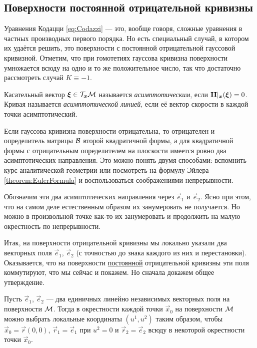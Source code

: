 \subsection{Поверхности постоянной отрицательной кривизны}

Уравнения Кодацци \eqref{eq:Codazzi} --- это, вообще говоря, сложные уравнения в частных производных первого порядка. Но есть специальный случай, в котором их удаётся решить, это поверхности с постоянной отрицательной гауссовой кривизной. Отметим, что при гомотетиях гауссова кривизна поверхности умножается всюду на одно и то же положительное число, так что достаточно рассмотреть случай $K \equiv -1$.

\begin{definition}
	Касательный вектор $\boldsymbol{\xi} \in \mathcal{T}_{\boldsymbol{x}}\mathcal{M}$ называется \textit{асимптотическим}, если $\boldsymbol{\operatorname{II}}|_{\boldsymbol{x}}(\boldsymbol{\xi}) = 0$. Кривая называется \textit{асимптотической линией}, если её вектор скорости в каждой точки асимптотический.
\end{definition}

Если гауссова кривизна поверхности отрицательна, то отрицателен и определитель матрицы $\mathcal{B}$ второй квадратичной формы, а для квадратичной формы с отрицательным определителем на плоскости имеется ровно два асимптотических направления. Это можно понять двумя способами: вспомнить курс аналитической геометрии или посмотреть на формулу Эйлера \ref{theorem:EulerFormula} и воспользоваться соображениями непрерывности.

Обозначим эти два асимптотических направления через $\vec{e}_1$ и $\vec{e}_2$. Ясно при этом, что на самом деле естественным образом их занумеровать не получается. Но можно в произвольной точке как-то их занумеровать и продолжить на малую окрестность по непрерывности.

Итак, на поверхности отрицательной кривизны мы локально указали два векторных поля $\vec{e}_1$, $\vec{e}_2$ (с точностью до знака каждого из них и перестановки). Оказывается, что на поверхности \underline{постоянной} отрицательной кривизны эти поля коммутируют, что мы сейчас и покажем. Но сначала докажем общее утверждение.

\begin{lemma} \label{lemma:WeakBasis}
	Пусть $\vec{e}_1$, $\vec{e}_2$ --- два единичных линейно независимых векторных поля на поверхности $\mathcal{M}$. Тогда в окрестности каждой точки $\vec{x}_0$ на поверхности $\mathcal{M}$ можно выбрать локальные координаты $(u^1, u^2)$ таким образом, чтобы $\vec{x}_0 = \vec{r}(0, 0)$, $\vec{r}_1 = \vec{e}_1$ при $u^2 = 0$ и $\vec{r}_2 = \vec{e}_2$ всюду в некоторой окрестности точки $\vec{x}_0$.
\end{lemma}

